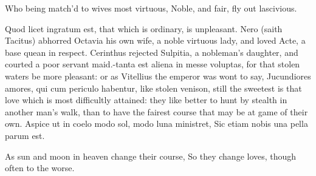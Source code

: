 {Who being match'd to wives most virtuous,
Noble, and fair, fly out lascivious.

Quod licet ingratum est, that which is ordinary, is unpleasant. Nero
(saith Tacitus) abhorred Octavia his own wife, a noble virtuous lady,
and loved Acte, a base quean in respect. Cerinthus rejected
Sulpitia, a nobleman's daughter, and courted a poor servant maid.-tanta
est aliena in messe voluptas, for that stolen waters be more
pleasant: or as Vitellius the emperor was wont to say, Jucundiores
amores, qui cum periculo habentur, like stolen venison, still the
sweetest is that love which is most difficultly attained: they like
better to hunt by stealth in another man's walk, than to have the
fairest course that may be at game of their own.
Aspice ut in coelo modo sol, modo luna ministret,
Sic etiam nobis una pella parum est.

As sun and moon in heaven change their course,
So they change loves, though often to the worse.

}
